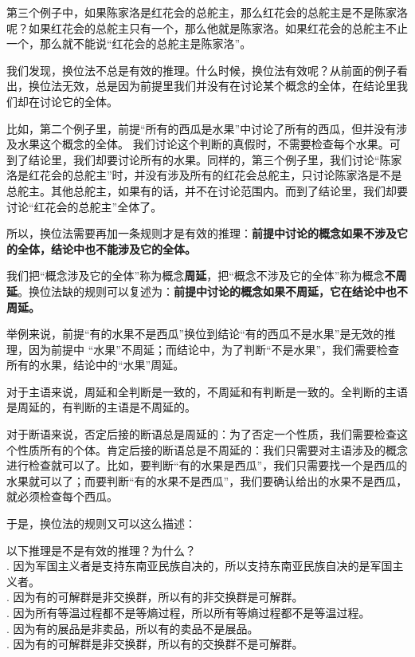 第三个例子中，如果陈家洛是红花会的总舵主，那么红花会的总舵主是不是陈家洛呢？如果红花会的总舵主只有一个，那么他就是陈家洛。如果红花会的总舵主不止一个，那么就不能说“红花会的总舵主是陈家洛”。

我们发现，换位法不总是有效的推理。什么时候，换位法有效呢？从前面的例子看出，换位法无效，总是因为前提里我们并没有在讨论某个概念的全体，在结论里我们却在讨论它的全体。

比如，第二个例子里，前提“所有的西瓜是水果”中讨论了所有的西瓜，但并没有涉及水果这个概念的全体。
我们讨论这个判断的真假时，不需要检查每个水果。可到了结论里，我们却要讨论所有的水果。同样的，第三个例子里，我们讨论“陈家洛是红花会的总舵主”时，并没有涉及所有的红花会总舵主，只讨论陈家洛是不是总舵主。其他总舵主，如果有的话，并不在讨论范围内。而到了结论里，我们却要讨论“红花会的总舵主”全体了。

所以，换位法需要再加一条规则才是有效的推理：\textbf{前提中讨论的概念如果不涉及它的全体，结论中也不能涉及它的全体。}

我们把“概念涉及它的全体”称为概念\textbf{周延}，把“概念不涉及它的全体”称为概念\textbf{不周延}。换位法缺的规则可以复述为：\textbf{前提中讨论的概念如果不周延，它在结论中也不周延。}

举例来说，前提“有的水果不是西瓜”换位到结论“有的西瓜不是水果”是无效的推理，因为前提中
“水果”不周延；而结论中，为了判断“不是水果”，我们需要检查所有的水果，结论中的“水果”周延。

对于主语来说，周延和全判断是一致的，不周延和有判断是一致的。全判断的主语是周延的，有判断的主语是不周延的。

对于断语来说，否定后接的断语总是周延的：为了否定一个性质，我们需要检查这个性质所有的个体。肯定后接的断语总是不周延的：我们只需要对主语涉及的概念进行检查就可以了。比如，要判断“有的水果是西瓜”，我们只需要找一个是西瓜的水果就可以了；而要判断“有的水果不是西瓜”，我们要确认给出的水果不是西瓜，就必须检查每个西瓜。

于是，换位法的规则又可以这么描述：
\begin{center}
\end{center}

\begin{xt}\label{xt:2b-1-0}
    以下推理是不是有效的推理？为什么？\\
    . 因为军国主义者是支持东南亚民族自决的，所以支持东南亚民族自决的是军国主义者。 \\
    . 因为有的可解群是非交换群，所以有的非交换群是可解群。 \\
    . 因为所有等温过程都不是等熵过程，所以所有等熵过程都不是等温过程。 \\
    . 因为有的展品是非卖品，所以有的卖品不是展品。 \\
    . 因为有的可解群是非交换群，所以有的交换群不是可解群。
\end{xt}

